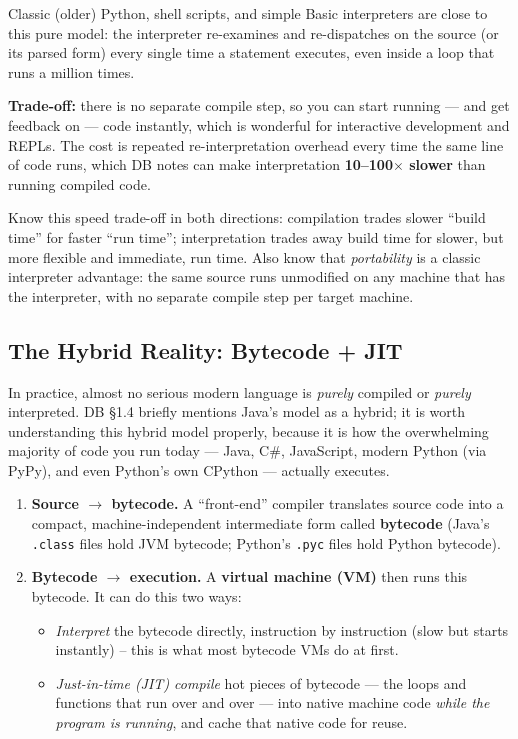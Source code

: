\documentclass[11pt]{article}
\begin{document}
Classic (older) Python, shell scripts, and simple Basic interpreters are close to this pure
model: the interpreter re-examines and re-dispatches on the source (or its parsed form) every
single time a statement executes, even inside a loop that runs a million times.

\textbf{Trade-off:} there is no separate compile step, so you can start running --- and get
feedback on --- code instantly, which is wonderful for interactive development and REPLs. The
cost is repeated re-interpretation overhead every time the same line of code runs, which DB
notes can make interpretation \textbf{10--100$\times$ slower} than running compiled code.

\begin{examfocus}
Know this speed trade-off in both directions: compilation trades slower ``build time'' for
faster ``run time''; interpretation trades away build time for slower, but more flexible and
immediate, run time. Also know that \emph{portability} is a classic interpreter advantage: the
same source runs unmodified on any machine that has the interpreter, with no separate compile
step per target machine.
\end{examfocus}

\subsection{The Hybrid Reality: Bytecode + JIT}

\beyonddb In practice, almost no serious modern language is \emph{purely} compiled or
\emph{purely} interpreted. DB \S1.4 briefly mentions Java's model as a hybrid; it is worth
understanding this hybrid model properly, because it is how the overwhelming majority of code
you run today --- Java, C\#, JavaScript, modern Python (via PyPy), and even Python's own CPython
--- actually executes.

\begin{enumerate}
  \item \textbf{Source $\to$ bytecode.} A ``front-end'' compiler translates source code into a
  compact, machine-independent intermediate form called \textbf{bytecode} (Java's \texttt{.class}
  files hold JVM bytecode; Python's \texttt{.pyc} files hold Python bytecode).
  \item \textbf{Bytecode $\to$ execution.} A \textbf{virtual machine (VM)} then runs this
  bytecode. It can do this two ways:
  \begin{itemize}
    \item \emph{Interpret} the bytecode directly, instruction by instruction (slow but starts
    instantly) -- this is what most bytecode VMs do at first.
    \item \emph{Just-in-time (JIT) compile} hot pieces of bytecode --- the loops and functions
    that run over and over --- into native machine code \emph{while the program is running}, and
    cache that native code for reuse.
  \end{itemize}
\end{enumerate}
\end{document}
